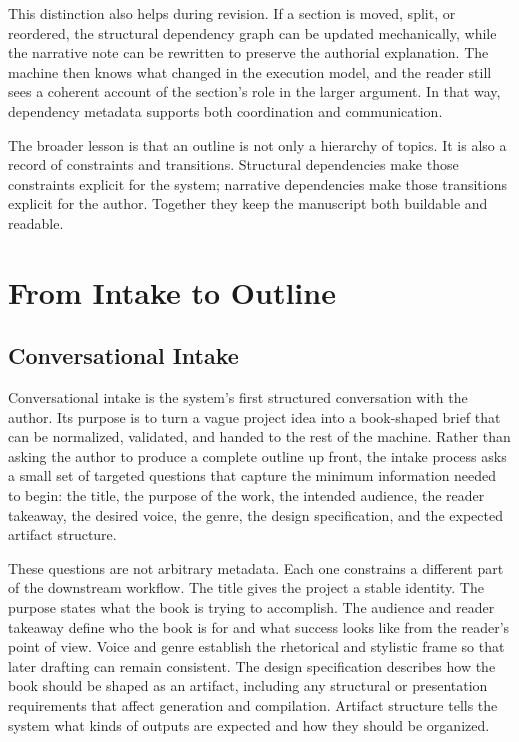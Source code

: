 \documentclass[11pt]{article}
\begin{document}
This distinction also helps during revision. If a section is moved, split, or reordered, the structural dependency graph can be updated mechanically, while the narrative note can be rewritten to preserve the authorial explanation. The machine then knows what changed in the execution model, and the reader still sees a coherent account of the section's role in the larger argument. In that way, dependency metadata supports both coordination and communication.

The broader lesson is that an outline is not only a hierarchy of topics. It is also a record of constraints and transitions. Structural dependencies make those constraints explicit for the system; narrative dependencies make those transitions explicit for the author. Together they keep the manuscript both buildable and readable.



\section{From Intake to Outline}

\subsection{Conversational Intake}


Conversational intake is the system's first structured conversation with the author. Its purpose is to turn a vague project idea into a book-shaped brief that can be normalized, validated, and handed to the rest of the machine. Rather than asking the author to produce a complete outline up front, the intake process asks a small set of targeted questions that capture the minimum information needed to begin: the title, the purpose of the work, the intended audience, the reader takeaway, the desired voice, the genre, the design specification, and the expected artifact structure.

These questions are not arbitrary metadata. Each one constrains a different part of the downstream workflow. The title gives the project a stable identity. The purpose states what the book is trying to accomplish. The audience and reader takeaway define who the book is for and what success looks like from the reader's point of view. Voice and genre establish the rhetorical and stylistic frame so that later drafting can remain consistent. The design specification describes how the book should be shaped as an artifact, including any structural or presentation requirements that affect generation and compilation. Artifact structure tells the system what kinds of outputs are expected and how they should be organized.
\end{document}
